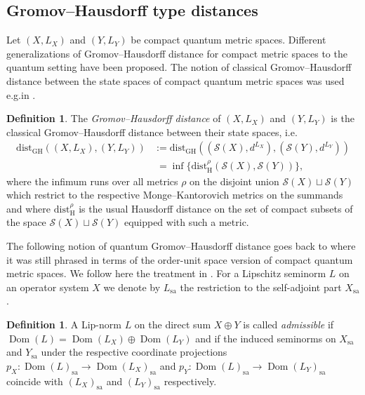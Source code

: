 \documentclass{amsart}
\theoremstyle{plain}
\theoremstyle{definition}
\newtheorem{definition}[theorem]{Definition}
\theoremstyle{remark}
\DeclareMathOperator{\Dom}{Dom}
\begin{document}
	\subsection{Gromov--Hausdorff type distances}
	
	Let $(X,L_X)$ and $(Y,L_Y)$ be compact quantum metric spaces.
	Different generalizations of Gromov--Hausdorff distance for compact metric spaces to the quantum setting have been proposed.
	The notion of classical Gromov--Hausdorff distance between the state spaces of compact quantum metric spaces was used e.g.\@ in \cite{CvS21, vS21}.
	
	\begin{definition}
		The \emph{Gromov--Hausdorff distance} of $(X,L_X)$ and $(Y,L_Y)$ is the classical Gromov--Hausdorff distance between their state spaces, i.e.\@
		\begin{equation}\label{eqn:GH-dist}
			\begin{aligned}
				\mathrm{dist}_{\mathrm{GH}}((X,L_X),(Y,L_Y))
				&:= \mathrm{dist}_{\mathrm{GH}}((\mathcal{S}(X),d^{L_X}),(\mathcal{S}(Y),d^{L_Y})) \\
				&\;= \inf\{\mathrm{dist}_\mathrm{H}^\rho(\mathcal{S}(X),\mathcal{S}(Y))\},
			\end{aligned}
		\end{equation} 
		where the infimum runs over all metrics $\rho$ on the disjoint union $\mathcal{S}(X) \sqcup \mathcal{S}(Y)$ which restrict to the respective Monge--Kantorovich metrics on the summands and where $\mathrm{dist}_\mathrm{H}^\rho$ is the usual Hausdorff distance \cite[Definition 7.3.1]{BBI01} on the set of compact subsets of the space $\mathcal{S}(X) \sqcup \mathcal{S}(Y)$ equipped with such a metric.
	\end{definition}
	
	The following notion of quantum Gromov--Hausdorff distance goes back to \cite{Rie04} where it was still phrased in terms of the order-unit space version of compact quantum metric spaces.
	We follow here the treatment in \cite[Section 2]{KK22}.
	For a Lipschitz seminorm $L$ on an operator system $X$ we denote by $L_{\mathrm{sa}}$ the restriction to the self-adjoint part $X_{\mathrm{sa}}$.
	
	\begin{definition}\label{def:Admissible-Lip-norm}
		A Lip-norm $L$ on the direct sum $X \oplus Y$ is called \emph{admissible} if $\Dom(L) = \Dom(L_X) \oplus \Dom(L_Y)$ and if the induced seminorms on $X_\mathrm{sa}$ and $Y_\mathrm{sa}$ under the respective coordinate projections $p_X : \Dom(L)_\mathrm{sa} \rightarrow \Dom(L_X)_\mathrm{sa}$ and $p_Y : \Dom(L)_\mathrm{sa} \rightarrow \Dom(L_Y)_\mathrm{sa}$ coincide with $(L_X)_\mathrm{sa}$ and $(L_Y)_\mathrm{sa}$ respectively.
	\end{definition}
	
\end{document}
